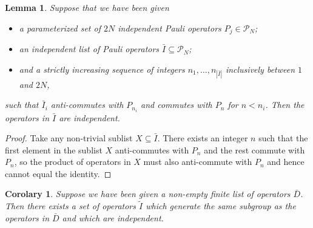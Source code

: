 \documentclass[twocolumn,showpacs,preprintnumbers,amsmath,amssymb,nofootinbib,pra,floatfix]{revtex4}
\newtheorem{lemma}{Lemma}
\newtheorem{corolary}{Corolary}
\newcommand{\lst}{\bar}
\newcommand{\set}{\tilde}
\begin{document}
\begin{lemma}
\label{result-is-independent}
Suppose that we have been given
\begin{itemize}
\item a parameterized set of $2N$ independent Pauli operators $P_j\in\mathscr{P}_N$;
\item an \emph{independent} list of Pauli operators $\lst I\subseteq \mathscr{P}_N$;
\item and a strictly increasing sequence of integers $n_1,\dots, n_{|\lst I|}$ inclusively between $1$ and $2N$,
\end{itemize}
such that $\lst I_i$ anti-commutes with $P_{n_i}$ and commutes with $P_n$ for $n< n_i$.  Then the operators in $\lst I$ are independent.
\end{lemma}

\begin{proof}
Take any non-trivial sublist $X\subseteq \lst I$.  There exists an integer $n$ such that the first element in the sublist $X$ anti-commutes with $P_n$ and the rest commute with $P_n$, so the product of operators in $X$ must also anti-commute with $P_n$ and hence cannot equal the identity.
\end{proof}

\begin{corolary}
\label{corolary-make-independent}
Suppose we have been given a non-empty finite list of operators $\lst D$.  Then there exists a set of operators $\set I$ which generate the same subgroup as the operators in $\lst D$ and which are independent.
\end{corolary}
\end{document}
